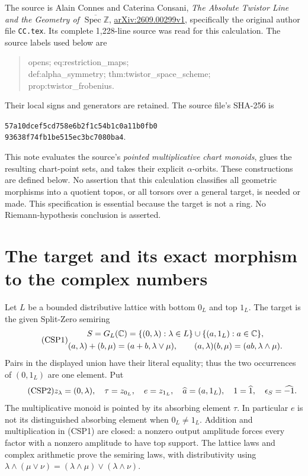 

The source is Alain Connes and Caterina Consani, \emph{The Absolute Twistor
Line and the Geometry of $\overline{\operatorname{Spec}\mathbb Z}$},
\href{https://arxiv.org/abs/2609.00299v1}{arXiv:2609.00299v1}, specifically
the original author file \nolinkurl{CC.tex}.  Its complete 1,228-line source
was read for this calculation.  The source labels used below are
\begin{quote}\ttfamily
opens; eq:restriction\_maps;\\
def:alpha\_symmetry; thm:twistor\_space\_scheme;\\
prop:twistor\_frobenius.
\end{quote}
Their local signs and generators are
retained.  The source file's SHA-256 is
\begin{center}\small\texttt{57a10dcef5cd758e6b2f1c54b1c0a11b0fb0}\\
\texttt{93638f74fb1be515ec3bc7080ba4}.\end{center}

This note evaluates the source's \emph{pointed multiplicative chart
monoids}, glues the resulting chart-point sets, and takes their explicit
$\alpha$-orbits.  These constructions are defined below.  No assertion
that this calculation classifies all geometric morphisms into a quotient
topos, or all torsors over a general target, is needed or made.  This
specification is essential because the target is not a ring.  No
Riemann-hypothesis conclusion is asserted.

\section{The target and its exact morphism to the complex numbers}

Let $L$ be a bounded distributive lattice with bottom $0_L$ and top $1_L$.
The target is the given Split-Zero semiring
\begin{equation}\tag{CSP1}
 \begin{gathered}
 S=G_L(\mathbb C)=\{(0,\lambda):\lambda\in L\}\cup
                   \{(a,1_L):a\in\mathbb C\},\\
 (a,\lambda)+(b,\mu)=(a+b,\lambda\vee\mu),\qquad
 (a,\lambda)(b,\mu)=(ab,\lambda\wedge\mu).
 \end{gathered}
\end{equation}
Pairs in the displayed union have their literal equality; thus the two
occurrences of $(0,1_L)$ are one element.  Put
\begin{equation}\tag{CSP2}
 z_\lambda=(0,\lambda),\quad \tau=z_{0_L},\quad e=z_{1_L},\quad
 \widehat a=(a,1_L),\quad 1=\widehat1,\quad \epsilon_S=\widehat{-1}.
\end{equation}
The multiplicative monoid is pointed by its absorbing element $\tau$.
In particular $e$ is not its distinguished absorbing element when
$0_L\ne1_L$.  Addition and multiplication in (CSP1) are closed: a
nonzero output amplitude forces every factor with a nonzero amplitude
to have top support.  The lattice laws and complex arithmetic prove
the semiring laws, with distributivity using
$\lambda\wedge(\mu\vee\nu)=(\lambda\wedge\mu)\vee
(\lambda\wedge\nu)$.

